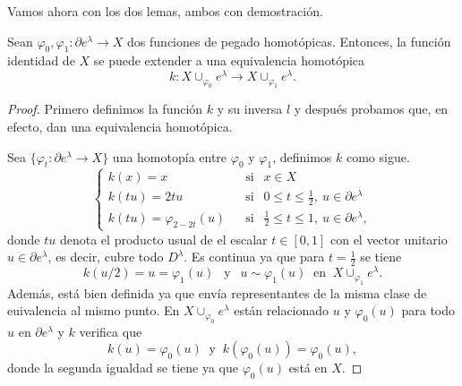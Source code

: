 \bigskip

Vamos ahora con los dos lemas, ambos con demostración.

\begin{lemma}
\label{lema1_democwvariedad}
    Sean $\varphi_0, \varphi_1: \partial e^{\lambda} \to X$ dos funciones de pegado homotópicas. Entonces, la función identidad de $X$ se puede extender a una equivalencia homotópica
    \begin{equation*}
        k: X\cup_{\varphi_0} e^{\lambda} \to X\cup_{\varphi_1} e^{\lambda}.
    \end{equation*}
\end{lemma}
\begin{proof}

    Primero definimos la función $k$ y su inversa $l$ y después probamos que, en efecto, dan una equivalencia homotópica. 
    
    Sea $\{\varphi_t:\partial e^{\lambda} \to X\}$ una homotopía entre $\varphi_0$ y $\varphi_1$, definimos $k$ como sigue.
    \begin{equation*}
        \begin{cases}
            k(x) = x &~~\text{ si }~~ x\in X\\
            k(tu) = 2tu &~~\text{ si }~~ 0\le t\le \frac{1}{2},~u\in \partial e^{\lambda}\\
            k(tu) = \varphi_{2-2t}(u) &~~\text{ si }~~  \frac{1}{2} \le t\le 1,~u\in \partial e^{\lambda},
        \end{cases}
    \end{equation*}
    donde $tu$ denota el producto usual de el escalar $t\in [0,1]$ con el vector unitario $u\in \partial e^{\lambda}$, es decir, cubre todo $D^{\lambda}$. Es continua ya que para $t=\frac{1}{2}$ se tiene
    \begin{equation*}
        k(u/2) = u = \varphi_{1}(u) ~~\text{ y }~~ u \sim \varphi_{1}(u) ~\text{ en }~ X\cup_{\varphi_1} e^{\lambda}.
    \end{equation*}
    Además, está bien definida ya que envía representantes de la misma clase de euivalencia al mismo punto. En $X\cup_{\varphi_0} e^{\lambda}$ están relacionado $u$ y $\varphi_0(u)$ para todo $u$ en $\partial e^{\lambda}$ y $k$ verifica que 
    \begin{equation*}
        k(u) = \varphi_{0}(u) ~\text{ y }~ k(\varphi_{0}(u)) = \varphi_{0}(u),
    \end{equation*} 
    donde la segunda igualdad se tiene ya que $\varphi_{0}(u)$ está en $X$.
      

\end{proof}
